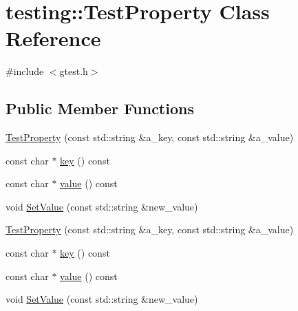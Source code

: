 \hypertarget{classtesting_1_1_test_property}{\section{testing\-:\-:Test\-Property Class Reference}
\label{classtesting_1_1_test_property}
}


{\ttfamily \#include $<$gtest.\-h$>$}

\subsection*{Public Member Functions}
\begin{DoxyCompactItemize}
\item 
\hyperlink{classtesting_1_1_test_property_a25a0ccf1c75a92af46a48d3c2a873e6d}{Test\-Property} (const std\-::string \&a\-\_\-key, const std\-::string \&a\-\_\-value)
\item 
const char $\ast$ \hyperlink{classtesting_1_1_test_property_a2c569d47685b89aa64e737fb11df3aba}{key} () const 
\item 
const char $\ast$ \hyperlink{classtesting_1_1_test_property_ad46323c18491f365d72d8a4288f54bd6}{value} () const 
\item 
void \hyperlink{classtesting_1_1_test_property_a377245335d9f614cd06d1650e3358e1d}{Set\-Value} (const std\-::string \&new\-\_\-value)
\item 
\hyperlink{classtesting_1_1_test_property_a25a0ccf1c75a92af46a48d3c2a873e6d}{Test\-Property} (const std\-::string \&a\-\_\-key, const std\-::string \&a\-\_\-value)
\item 
const char $\ast$ \hyperlink{classtesting_1_1_test_property_a2c569d47685b89aa64e737fb11df3aba}{key} () const 
\item 
const char $\ast$ \hyperlink{classtesting_1_1_test_property_ad46323c18491f365d72d8a4288f54bd6}{value} () const 
\item 
void \hyperlink{classtesting_1_1_test_property_a377245335d9f614cd06d1650e3358e1d}{Set\-Value} (const std\-::string \&new\-\_\-value)
\end{DoxyCompactItemize}


